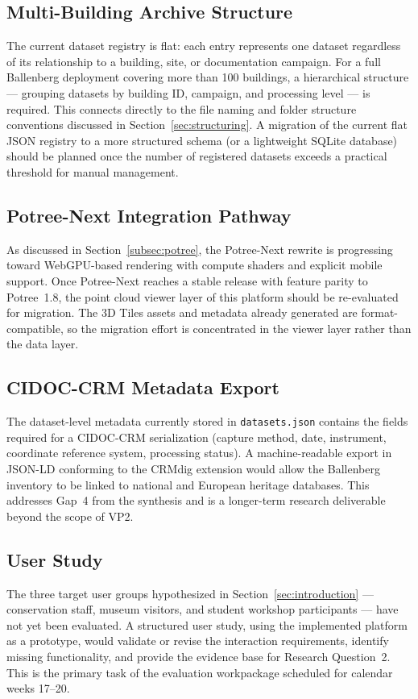 \subsection{Multi-Building Archive Structure}

The current dataset registry is flat: each entry represents one dataset
regardless of its relationship to a building, site, or documentation campaign.
For a full Ballenberg deployment covering more than 100 buildings, a
hierarchical structure — grouping datasets by building ID, campaign, and
processing level — is required. This connects directly to the file naming and
folder structure conventions discussed in Section~\ref{sec:structuring}. A
migration of the current flat JSON registry to a more structured schema (or a
lightweight SQLite database) should be planned once the number of registered
datasets exceeds a practical threshold for manual management.

\subsection{Potree-Next Integration Pathway}

As discussed in Section~\ref{subsec:potree}, the Potree-Next rewrite is
progressing toward WebGPU-based rendering with compute shaders and explicit
mobile support. Once Potree-Next reaches a stable release with feature parity
to Potree~1.8, the point cloud viewer layer of this platform should be
re-evaluated for migration. The 3D Tiles assets and metadata already generated
are format-compatible, so the migration effort is concentrated in the viewer
layer rather than the data layer.

\subsection{CIDOC-CRM Metadata Export}

The dataset-level metadata currently stored in \texttt{datasets.json} contains
the fields required for a CIDOC-CRM serialization (capture method, date,
instrument, coordinate reference system, processing status). A machine-readable
export in JSON-LD conforming to the CRMdig extension would allow the Ballenberg
inventory to be linked to national and European heritage databases. This
addresses Gap~4 from the synthesis and is a longer-term research deliverable
beyond the scope of VP2.

\subsection{User Study}

The three target user groups hypothesized in Section~\ref{sec:introduction} —
conservation staff, museum visitors, and student workshop participants — have
not yet been evaluated. A structured user study, using the implemented platform
as a prototype, would validate or revise the interaction requirements, identify
missing functionality, and provide the evidence base for Research
Question~2. This is the primary task of the evaluation workpackage scheduled
for calendar weeks 17--20.
